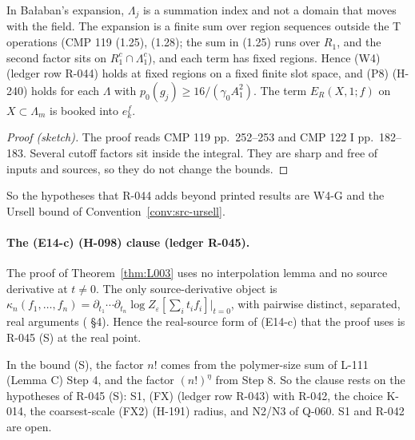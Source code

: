 \begin{proposition}\label{src:B20-LAMBDAJ}
In Ba{\l}aban's expansion, $\Lambda_j$ is a summation index and not a domain that moves with the field. The expansion is a finite sum over region sequences outside the T operations (CMP 119 (1.25), (1.28); the sum in (1.25) runs over $R_1$, and the second factor sits on $R_1^c\cap\Lambda_1^c$), and each term has fixed regions. Hence (W4) (ledger row R-044) holds at fixed regions on a fixed finite slot space, and (P8) (H-240) holds for each $\Lambda$ with $p_0(g_j)\ge16/(\gamma_0A_1^2)$. The term $E_R(X,1;f)$ on $X\subset\Lambda_m$ is booked into $e_k^f$.
\end{proposition}
\begin{proof}[Proof (sketch)]
The proof reads CMP 119 pp.~252--253 and CMP 122 I pp.~182--183. Several cutoff factors sit inside the integral. They are sharp and free of inputs and sources, so they do not change the bounds.
\end{proof}
So the hypotheses that R-044 adds beyond printed results are W4-G and the Ursell bound of Convention~\ref{conv:src-ursell}.

\paragraph{The (E14-c) (H-098) clause (ledger R-045).}
\begin{proposition}\label{src:B21-E14C}
The proof of Theorem~\ref{thm:L003} uses no interpolation lemma and no source derivative at $t\ne0$. The only source-derivative object is $\kappa_n(f_1,\dots,f_n)=\partial_{t_1}\cdots\partial_{t_n}\log Z_\varepsilon[\sum_it_if_i]|_{t=0}$, with pairwise distinct, separated, real arguments ( \S4). Hence the real-source form of (E14-c) that the proof uses is R-045 (S) at the real point.
\end{proposition}
In the bound (S), the factor $n!$ comes from the polymer-size sum of L-111 (Lemma C) Step 4, and the factor $(n!)^\eta$ from Step 8. So the clause rests on the hypotheses of R-045 (S): S1, (FX) (ledger row R-043) with R-042, the choice K-014, the coarsest-scale (FX2) (H-191) radius, and N2/N3 of Q-060. S1 and R-042 are open.

